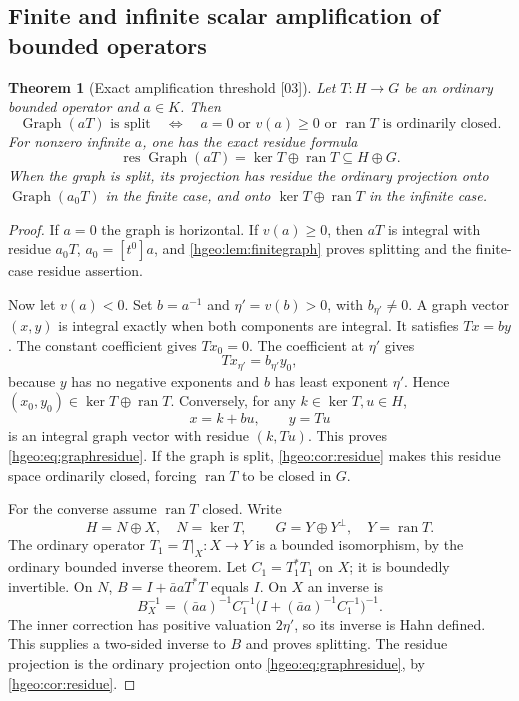\documentclass[11pt,letterpaper]{article}
\numberwithin{equation}{section}
\newtheorem{theorem}{Theorem}[section]
\theoremstyle{definition}
\theoremstyle{remark}
\newcommand{\K}{K}
\newcommand{\ran}{\operatorname{ran}}
\newcommand{\res}{\operatorname{res}}
\newcommand{\Graph}{\operatorname{Graph}}
\newcommand{\src}[1]{\textup{\textsf{\small[#1]}}}
\begin{document}
\subsection{Finite and infinite scalar amplification of bounded operators}

\begin{theorem}[Exact amplification threshold \src{03}]\label{hgeo:thm:threshold}
Let $T:H\to G$ be an ordinary bounded operator and $a\in\K$.
Then
\begin{equation}\label{hgeo:eq:threshold}
 \Graph(aT)\text{ is split}
 \quad\Longleftrightarrow\quad
 a=0\text{ or }v(a)\ge0\text{ or }\ran T\text{ is ordinarily closed}.
\end{equation}
For nonzero infinite $a$, one has the exact residue formula
\begin{equation}\label{hgeo:eq:graphresidue}
 \res\Graph(aT)=\ker T\oplus\ran T\subseteq H\oplus G.
\end{equation}
When the graph is split, its projection has residue the ordinary
projection onto $\Graph(a_0T)$ in the finite case, and onto
$\ker T\oplus\ran T$ in the infinite case.
\end{theorem}
\begin{proof}
If $a=0$ the graph is horizontal. If $v(a)\ge0$, then $aT$ is integral with
residue $a_0T$, $a_0=[t^0]a$, and \cref{hgeo:lem:finitegraph} proves
splitting and the finite-case residue assertion.

Now let $v(a)<0$. Set $b=a^{-1}$ and $\eta'=v(b)>0$, with
$b_{\eta'}\ne0$. A graph vector $(x,y)$ is integral exactly when both
components are integral. It satisfies $Tx=by$. The constant
coefficient gives $Tx_0=0$. The coefficient at $\eta'$ gives
\[
 T x_{\eta'}=b_{\eta'} y_0,
\]
because $y$ has no negative exponents and $b$ has least exponent
$\eta'$. Hence $(x_0,y_0)\in\ker T\oplus\ran T$.
Conversely, for any $k\in\ker T,u\in H$,
\[
 x=k+bu,\qquad y=Tu
\]
is an integral graph vector with residue $(k,Tu)$. This proves
\eqref{hgeo:eq:graphresidue}. If the graph is split,
\cref{hgeo:cor:residue} makes this residue space ordinarily
closed, forcing $\ran T$ to be closed in $G$.

For the converse assume $\ran T$ closed. Write
\[
 H=N\oplus X,\quad N=\ker T,\qquad
 G=Y\oplus Y^\perp,\quad Y=\ran T.
\]
The ordinary operator $T_1=T|_X:X\to Y$ is a bounded isomorphism,
by the ordinary bounded inverse theorem. Let $C_1=T_1^*T_1$ on $X$;
it is boundedly invertible. On $N$, $B=I+\bar a a T^*T$ equals $I$.
On $X$ an inverse is
\begin{equation}\label{hgeo:eq:infinitegraphinverse}
 B_X^{-1}=(\bar a a)^{-1}C_1^{-1}
      \bigl(I+(\bar a a)^{-1}C_1^{-1}\bigr)^{-1}.
\end{equation}
The inner correction has positive valuation $2\eta'$, so its inverse
is Hahn defined. This supplies a two-sided inverse to $B$ and proves
splitting. The residue projection is the ordinary projection onto
\eqref{hgeo:eq:graphresidue}, by \cref{hgeo:cor:residue}.
\end{proof}
\end{document}
